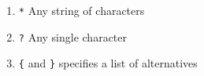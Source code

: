 \begin{enumerate}
\item \texttt{*} Any string of characters \\
\item \texttt{?} Any single character \\
\item \texttt{\{} and \texttt{\}} specifies a list of alternatives
\end{enumerate}
